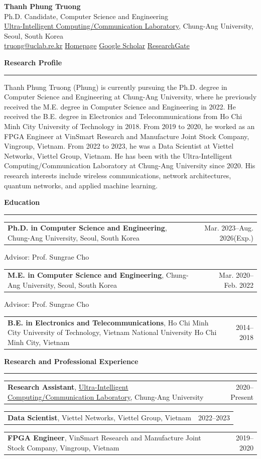\documentclass[10pt,letterpaper]{article}
\makeatletter
\newcommand{\sectiontitle}[1]{%
  \vspace{0.9em}
  {\large\bfseries #1}\par
  \vspace{0.25em}\hrule\vspace{0.55em}
}
\newcommand{\datedentry}[3]{%
  \begin{tabular*}{\textwidth}{@{}p{0.72\textwidth}@{\extracolsep{\fill}}r@{}}
    #1 & #2 \\
  \end{tabular*}
  #3\par\vspace{0.45em}
}
\makeatother
\begin{document}
\begin{center}
{\LARGE \textbf{Thanh Phung Truong}}\\[0.25em]
Ph.D. Candidate, Computer Science and Engineering\\
\href{https://uclab.re.kr}{Ultra-Intelligent Computing/Communication Laboratory}, Chung-Ang University, Seoul, South Korea\\[0.25em]
\href{mailto:truong@uclab.re.kr}{truong@uclab.re.kr} \quad
\href{https://thanhphungtruong.github.io/}{Homepage} \quad
\href{https://scholar.google.com/citations?user=YdQkVpgAAAAJ&hl=vi}{Google Scholar} \quad
\href{https://www.researchgate.net/profile/Thanh-Phung-Truong}{ResearchGate}
\end{center}

\sectiontitle{Research Profile}
Thanh Phung Truong (Phung) is currently pursuing the Ph.D. degree in Computer Science and Engineering at Chung-Ang University, where he previously received the M.E. degree in Computer Science and Engineering in 2022. He received the B.E. degree in Electronics and Telecommunications from Ho Chi Minh City University of Technology in 2018. From 2019 to 2020, he worked as an FPGA Engineer at VinSmart Research and Manufacture Joint Stock Company, Vingroup, Vietnam. From 2022 to 2023, he was a Data Scientist at Viettel Networks, Viettel Group, Vietnam. He has been with the Ultra-Intelligent Computing/Communication Laboratory at Chung-Ang University since 2020. His research interests include wireless communications, network architectures, quantum networks, and applied machine learning.

\sectiontitle{Education}
\datedentry{\textbf{Ph.D. in Computer Science and Engineering}, Chung-Ang University, Seoul, South Korea}{Mar. 2023--Aug. 2026(Exp.)}{Advisor: Prof. Sungrae Cho}
\datedentry{\textbf{M.E. in Computer Science and Engineering}, Chung-Ang University, Seoul, South Korea}{Mar. 2020--Feb. 2022}{Advisor: Prof. Sungrae Cho}
\datedentry{\textbf{B.E. in Electronics and Telecommunications}, Ho Chi Minh City University of Technology, Vietnam National University Ho Chi Minh City, Vietnam}{2014--2018}{}

\sectiontitle{Research and Professional Experience}
\datedentry{\textbf{Research Assistant}, \href{https://uclab.re.kr}{Ultra-Intelligent Computing/Communication Laboratory}, Chung-Ang University}{2020--Present}{}
\datedentry{\textbf{Data Scientist}, Viettel Networks, Viettel Group, Vietnam}{2022--2023}{}
\datedentry{\textbf{FPGA Engineer}, VinSmart Research and Manufacture Joint Stock Company, Vingroup, Vietnam}{2019--2020}{}
\end{document}
